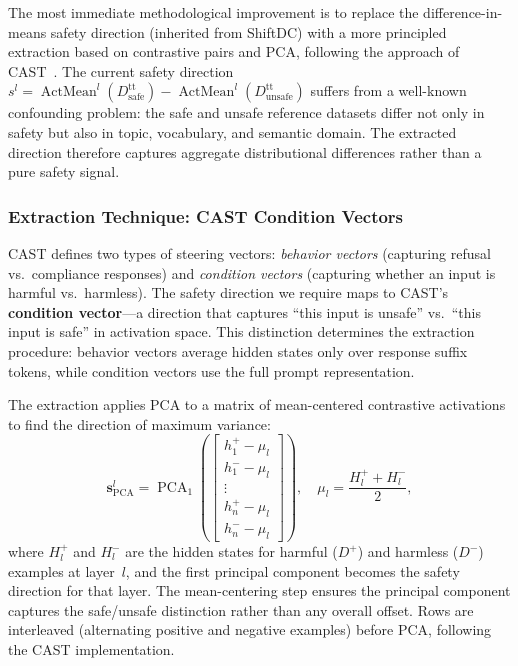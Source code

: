 \documentclass{article}
\begin{document}
The most immediate methodological improvement is to replace the
difference-in-means safety direction (inherited from ShiftDC) with a more
principled extraction based on contrastive pairs and PCA, following the approach
of CAST~\citep{bai2024cast}.  The current safety direction
$s^l = \operatorname{ActMean}^l(D_{\mathrm{safe}}^{\mathrm{tt}}) -
\operatorname{ActMean}^l(D_{\mathrm{unsafe}}^{\mathrm{tt}})$ suffers from a
well-known confounding problem: the safe and unsafe reference datasets differ not
only in safety but also in topic, vocabulary, and semantic domain.  The extracted
direction therefore captures aggregate distributional differences rather than a
pure safety signal.

\subsubsection*{Extraction Technique: CAST Condition Vectors}

CAST defines two types of steering vectors: \emph{behavior vectors} (capturing
refusal vs.\ compliance responses) and \emph{condition vectors} (capturing
whether an input is harmful vs.\ harmless).  The safety direction we require maps
to CAST's \textbf{condition vector}---a direction that captures
``this input is unsafe'' vs.\ ``this input is safe'' in activation space.  This
distinction determines the extraction procedure: behavior vectors average hidden
states only over response suffix tokens, while condition vectors use the full
prompt representation.

The extraction applies PCA to a matrix of mean-centered contrastive activations
to find the direction of maximum variance:
\begin{equation}
  \mathbf{s}^l_{\mathrm{PCA}} = \operatorname{PCA}_1\!\left(
    \begin{bmatrix}
      h_1^+ - \mu_l \\ h_1^- - \mu_l \\ \vdots \\ h_n^+ - \mu_l \\ h_n^- - \mu_l
    \end{bmatrix}
  \right),
  \quad
  \mu_l = \frac{H_l^+ + H_l^-}{2},
  \label{eq:cast_pca}
\end{equation}
where $H_l^+$ and $H_l^-$ are the hidden states for harmful ($D^+$) and harmless
($D^-$) examples at layer~$l$, and the first principal component becomes the
safety direction for that layer.  The mean-centering step ensures the principal
component captures the safe/unsafe distinction rather than any overall offset.
Rows are interleaved (alternating positive and negative examples) before PCA,
following the CAST implementation.
\end{document}
